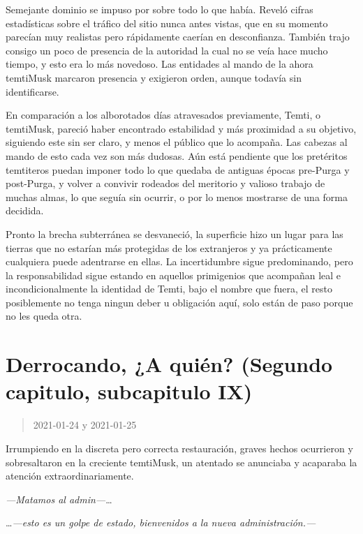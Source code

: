 \documentclass[
  spanish,
]{book}
\begin{document}
Semejante dominio se impuso por sobre todo lo que había. Reveló cifras estadísticas sobre el tráfico del sitio nunca antes vistas, que en su momento parecían muy realistas pero rápidamente caerían en desconfianza. También trajo consigo un poco de presencia de la autoridad la cual no se veía hace mucho tiempo, y esto era lo más novedoso. Las entidades al mando de la ahora temtiMusk marcaron presencia y exigieron orden, aunque todavía sin identificarse.

En comparación a los alborotados días atravesados previamente, Temti, o temtiMusk, pareció haber encontrado estabilidad y más proximidad a su objetivo, siguiendo este sin ser claro, y menos el público que lo acompaña. Las cabezas al mando de esto cada vez son más dudosas. Aún está pendiente que los pretéritos temtiteros puedan imponer todo lo que quedaba de antiguas épocas pre-Purga y post-Purga, y volver a convivir rodeados del meritorio y valioso trabajo de muchas almas, lo que seguía sin ocurrir, o por lo menos mostrarse de una forma decidida.

Pronto la brecha subterránea se desvaneció, la superficie hizo un lugar para las tierras que no estarían más protegidas de los extranjeros y ya prácticamente cualquiera puede adentrarse en ellas.
La incertidumbre sigue predominando, pero la responsabilidad sigue estando en aquellos primigenios que acompañan leal e incondicionalmente la identidad de Temti, bajo el nombre que fuera, el resto posiblemente no tenga ningun deber u obligación aquí, solo están de paso porque no les queda otra.

\hypertarget{derrocando-a-quiuxe9n-segundo-capitulo-subcapitulo-ix}{%
\section{Derrocando, ¿A quién? (Segundo capitulo, subcapitulo IX)}\label{derrocando-a-quiuxe9n-segundo-capitulo-subcapitulo-ix}}

\begin{quote}
2021-01-24 y 2021-01-25
\end{quote}

Irrumpiendo en la discreta pero correcta restauración, graves hechos ocurrieron y sobresaltaron en la creciente temtiMusk, un atentado se anunciaba y acaparaba la atención extraordinariamente.

\emph{---Matamos al admin---}\ldots{}

\ldots{}\emph{---esto es un golpe de estado, bienvenidos a la nueva administración.---}
\end{document}
